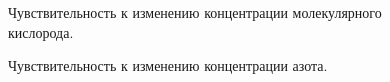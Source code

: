 \documentclass[14pt, a4paper, fleqn]{extarticle}
\begin{document}
\begin{figure}
\caption{Чувствительность к изменению концентрации молекулярного кислорода.}
\end{figure}

\begin{figure}
\caption{Чувствительность к изменению концентрации азота.}
\end{figure}



\end{document}
